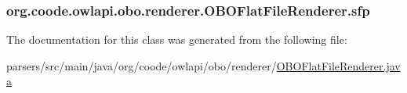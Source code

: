 \hypertarget{classorg_1_1coode_1_1owlapi_1_1obo_1_1renderer_1_1_o_b_o_flat_file_renderer_a02105d0908b632eb8292a61e98c8b7c7}{
\subsubsection[{sfp}]{ org.\-coode.\-owlapi.\-obo.\-renderer.\-O\-B\-O\-Flat\-File\-Renderer.\-sfp\hspace{0.3cm}{\ttfamily [private]}}}\label{classorg_1_1coode_1_1owlapi_1_1obo_1_1renderer_1_1_o_b_o_flat_file_renderer_a02105d0908b632eb8292a61e98c8b7c7}


The documentation for this class was generated from the following file\-:\begin{DoxyCompactItemize}
\item 
parsers/src/main/java/org/coode/owlapi/obo/renderer/\hyperlink{_o_b_o_flat_file_renderer_8java}{O\-B\-O\-Flat\-File\-Renderer.\-java}\end{DoxyCompactItemize}
